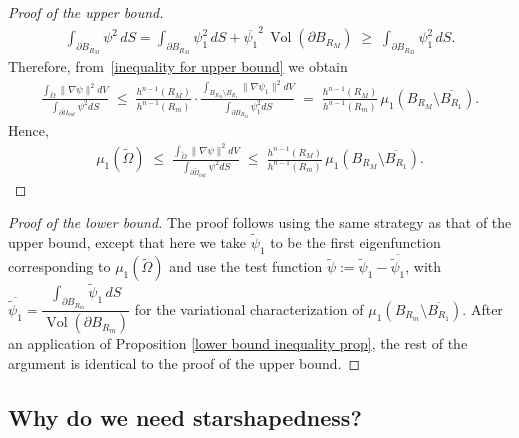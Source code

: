 \documentclass[12pt,reqno]{amsart}
\numberwithin{equation}{section}
\numberwithin{theorem}{section}
\numberwithin{equation}{section}
\numberwithin{theorem}{section}
\begin{document}
\begin{proof} [Proof of the upper bound]
\begin{align*}
    \int_{\partial B_{R_M}} \psi^2 \, dS 
    = \int_{\partial B_{R_M}} \psi_1^2 \, dS 
      + \overline{\psi_1}^2 \, \operatorname{Vol}(\partial B_{R_M})
    \;\geq\; \int_{\partial B_{R_M}} \psi_1^2 \, dS. 
\end{align*}
Therefore, from~\eqref{inequality for upper bound} we obtain
\begin{align*}
    \frac{\displaystyle \int_{\tilde{\Omega}} \|\nabla\psi\|^2 dV}{\displaystyle \int_{\partial\tilde{\Omega}_{out}} \psi^2 dS}
    \;\leq\;
    \frac{h^{n-1}(R_M)}{h^{n-1}(R_m)} 
    \cdot
    \frac{\displaystyle \int_{B_{R_M}\setminus \overline{B_{R_1}}} \|\nabla\psi_1\|^2 dV}{\displaystyle \int_{\partial B_{R_M}} \psi_1^2 dS}
    \;=\;
    \frac{h^{n-1}(R_M)}{h^{n-1}(R_m)} 
    \,\mu_1(B_{R_M}\setminus \overline{B_{R_1}}).
\end{align*}
Hence,
\begin{align*}
   \mu_1(\tilde{\Omega})\;\leq\; \frac{\displaystyle \int_{\tilde{\Omega}} \|\nabla\psi\|^2 dV}{\displaystyle \int_{\partial \tilde{\Omega}_{out}} \psi^2 dS}
\;\leq\;
\frac{h^{n-1}(R_M)}{h^{n-1}(R_m)} \,\mu_1(B_{R_M}\setminus \overline{B_{R_1}}). 
\end{align*}
\end{proof}

\begin{proof} [Proof of the lower bound]
The proof follows using the same strategy as that of the upper bound, except that here we take $\tilde{\psi}_1$ to be the first eigenfunction corresponding to $\mu_1(\tilde{\Omega})$ and use the test function 
$\tilde{\psi} := \tilde{\psi}_1 - \overline{\tilde{\psi}_1}$, with  
$\overline{\tilde{\psi}_1} = \dfrac{\int_{\partial B_{R_m}} \tilde{\psi}_1 \, dS}{\operatorname{Vol}(\partial B_{R_m})}$ for the variational characterization of $\mu_1(B_{R_m}\setminus \overline{B_{R_1}})$. After an application of Proposition \ref{lower bound inequality prop}, 
the rest of the argument is identical to the proof of the upper bound.

\end{proof}


\subsection{Why do we need starshapedness?}



\end{document}
